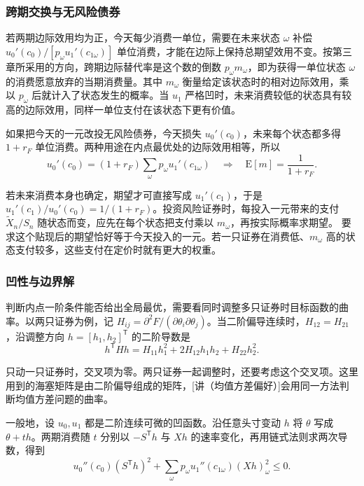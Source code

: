 \subsubsection{跨期交换与无风险债券}
若两期边际效用均为正，今天每少消费一单位，需要在未来状态 $\omega$ 补偿 $u_0'(c_0)/[p_\omega u_1'(c_{1\omega})]$ 单位消费，才能在边际上保持总期望效用不变。按第三章所采用的方向，跨期边际替代率是这个数的倒数 $p_\omega m_\omega$，即为获得一单位状态 $\omega$ 的消费愿意放弃的当期消费量。其中 $m_\omega$ 衡量给定该状态时的相对边际效用，乘以 $p_\omega$ 后就计入了状态发生的概率。当 $u_1$ 严格凹时，未来消费较低的状态具有较高的边际效用，同样一单位支付在该状态下更有价值。

如果把今天的一元改投无风险债券，今天损失 $u_0'(c_0)$，未来每个状态都多得 $1+r_F$ 单位消费。两种用途在内点最优处的边际效用相等，所以
\[
 u_0'(c_0)
 =(1+r_F)\sum_\omega p_\omega u_1'(c_{1\omega})
 \quad\Longrightarrow\quad
 \mathrm E[m]=\frac{1}{1+r_F}.
\]

若未来消费本身也确定，期望才可直接写成 $u_1'(c_1)$，于是 $u_1'(c_1)/u_0'(c_0)=1/(1+r_F)$。投资风险证券时，每投入一元带来的支付 $\widetilde X_n/S_n$ 随状态而变，应先在每个状态把支付乘以 $m_\omega$，再按实际概率求期望。 要求这个贴现后的期望恰好等于今天投入的一元。若一只证券在消费低、$m_\omega$ 高的状态支付较多，这些支付在定价时就有更大的权重。

\subsubsection{凹性与边界解}
判断内点一阶条件能否给出全局最优，需要看同时调整多只证券时目标函数的曲率。以两只证券为例，记 $H_{ij}=\partial^2F/(\partial\theta_i\partial\theta_j)$。当二阶偏导连续时，$H_{12}=H_{21}$，沿调整方向 $h=[h_1,h_2]^{\mathsf T}$ 的二阶导数是
\[
 h^{\mathsf T}Hh
 =H_{11}h_1^2+2H_{12}h_1h_2+H_{22}h_2^2.
\]

只动一只证券时，交叉项为零。两只证券一起调整时，还要考虑这个交叉项。这里用到的海塞矩阵是由二阶偏导组成的矩阵，[讲（均值方差偏好）]会用同一方法判断均值方差问题的曲率。

一般地，设 $u_0,u_1$ 都是二阶连续可微的凹函数。沿任意头寸变动 $h$ 将 $\theta$ 写成 $\theta+th$。两期消费随 $t$ 分别以 $-S^{\mathsf T}h$ 与 $Xh$ 的速率变化，再用链式法则求两次导数，得到
\[
 u_0''(c_0)(S^{\mathsf T}h)^2+
 \sum_\omega p_\omega u_1''(c_{1\omega})(Xh)_\omega^2\le0.
\]

